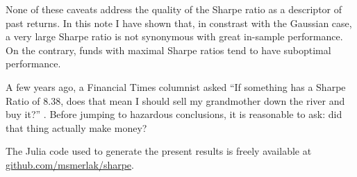 \documentclass[
reprint,
amsmath,amssymb,
aps,
]{revtex4-2}
\begin{document}
None of these caveats address the quality of the Sharpe ratio as a descriptor of past returns. 
In this note I have shown that, in constrast with the Gaussian case, a very large Sharpe ratio is not synonymous with great in-sample performance. 
On the contrary, funds with maximal Sharpe ratios tend to have suboptimal performance. 

A few years ago, a Financial Times columnist asked ``If something has a Sharpe Ratio of 8.38, does that mean I should sell my grandmother down the river and buy it?'' \cite{shubberIf2016}. 
Before jumping to hazardous conclusions, it is reasonable to ask: did that thing actually make money? 

\medskip

The Julia code used to generate the present results is freely available at \url{github.com/msmerlak/sharpe}. 


\end{document}
